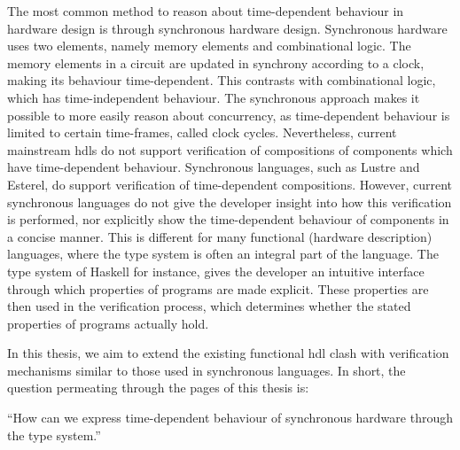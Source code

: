 The most common method to reason about time-dependent behaviour in hardware design is through synchronous hardware design.
Synchronous hardware uses two elements, namely memory elements and combinational logic.
The memory elements in a circuit are updated in synchrony according to a clock, making its behaviour time-dependent.
This contrasts with combinational logic, which has time-independent behaviour.
The synchronous approach makes it possible to more easily reason about concurrency, as time-dependent behaviour is limited to certain time-frames, called clock cycles.  
Nevertheless, current mainstream \glspl{hdl} do not support verification of compositions of components which have time-dependent behaviour.
Synchronous languages, such as Lustre\cite{halbwachs1993tutorial} and Esterel\cite{berry1992esterel}, do support verification of time-dependent compositions.
However, current synchronous languages do not give the developer insight into how this verification is performed, nor explicitly show the time-dependent behaviour of components in a concise manner.
This is different for many functional (hardware description) languages, where the type system is often an integral part of the language.
The type system of Haskell for instance, gives the developer an intuitive interface through which properties of programs are made explicit.
These properties are then used in the verification process, which determines whether the stated properties of programs actually hold.

In this thesis, we aim to extend the existing functional \gls{hdl} \gls{clash} with verification mechanisms similar to those used in synchronous languages.
In short, the question permeating through the pages of this thesis is:\newline
\begin{changemargin}{1cm}{1cm}
\begin{doublespace}
\Large ``How can we express time-dependent behaviour of synchronous hardware through the type system.''  
\end{doublespace}
\end{changemargin}

